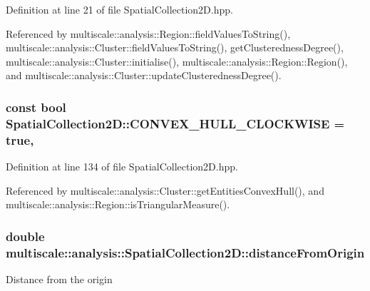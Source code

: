 Definition at line 21 of file Spatial\-Collection2\-D.\-hpp.



Referenced by multiscale\-::analysis\-::\-Region\-::field\-Values\-To\-String(), multiscale\-::analysis\-::\-Cluster\-::field\-Values\-To\-String(), get\-Clusteredness\-Degree(), multiscale\-::analysis\-::\-Cluster\-::initialise(), multiscale\-::analysis\-::\-Region\-::\-Region(), and multiscale\-::analysis\-::\-Cluster\-::update\-Clusteredness\-Degree().

\hypertarget{classmultiscale_1_1analysis_1_1SpatialCollection2D_aa379350e6bee0f58f380152048aa4c21}{
\subsubsection[{C\-O\-N\-V\-E\-X\-\_\-\-H\-U\-L\-L\-\_\-\-C\-L\-O\-C\-K\-W\-I\-S\-E}]{\setlength{\rightskip}{0pt plus 5cm}const bool Spatial\-Collection2\-D\-::\-C\-O\-N\-V\-E\-X\-\_\-\-H\-U\-L\-L\-\_\-\-C\-L\-O\-C\-K\-W\-I\-S\-E = true\hspace{0.3cm}{\ttfamily [static]}, {\ttfamily [protected]}}}\label{classmultiscale_1_1analysis_1_1SpatialCollection2D_aa379350e6bee0f58f380152048aa4c21}


Definition at line 134 of file Spatial\-Collection2\-D.\-hpp.



Referenced by multiscale\-::analysis\-::\-Cluster\-::get\-Entities\-Convex\-Hull(), and multiscale\-::analysis\-::\-Region\-::is\-Triangular\-Measure().

\hypertarget{classmultiscale_1_1analysis_1_1SpatialCollection2D_ac2a5d3f8c2cb878c710d821c536b8a4f}{
\subsubsection[{distance\-From\-Origin}]{\setlength{\rightskip}{0pt plus 5cm}double multiscale\-::analysis\-::\-Spatial\-Collection2\-D\-::distance\-From\-Origin\hspace{0.3cm}{\ttfamily [protected]}}}\label{classmultiscale_1_1analysis_1_1SpatialCollection2D_ac2a5d3f8c2cb878c710d821c536b8a4f}
Distance from the origin 


